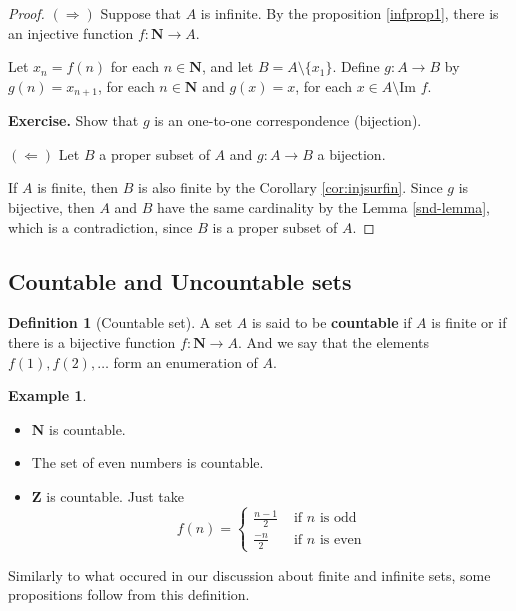 \documentclass[12pt,a4paper]{article}
\theoremstyle{definition}
\newtheorem{example}{Example}[section]
\newtheorem{definition}{Definition}[section]
\begin{document}
\begin{proof}
	$(\Rightarrow)$ Suppose that $A$ is infinite. By the proposition \ref{infprop1}, there is an injective function $f : \textbf{N} \longrightarrow A$.
	
	Let $x_n = f(n)$ for each $n \in \textbf{N}$, and let $B = A \setminus \{ x_1 \}$. Define $g : A \longrightarrow B$ by $g(n) = x_{n+1}$, for each $n \in \textbf{N}$ and $g(x) = x$, for each $x \in A \setminus \text{Im } f$.
	
	\textbf{Exercise.} Show that $g$ is an one-to-one correspondence (bijection).
	
	$(\Leftarrow)$ Let $B$ a proper subset of $A$ and $g : A \longrightarrow B$ a bijection.
	
	If $A$ is finite, then $B$ is also finite by the Corollary \ref{cor:injsurfin}. Since $g$ is bijective, then $A$ and $B$ have the same cardinality by the Lemma \ref{snd-lemma}, which is a contradiction, since $B$ is a proper subset of $A$.
\end{proof}

\subsection{Countable and Uncountable sets}

\begin{definition}[Countable set]
	A set $A$ is said to be \textbf{countable} if $A$ is finite or if there is a bijective function $f : \textbf{N} \longrightarrow A$. And we say that the elements $f(1), f(2), \ldots$ form an enumeration of $A$.
\end{definition}

\begin{example} \hfill
	\begin{itemize}
		\item $\textbf{N}$ is countable.
		\item The set of even numbers is countable.
		\item $\textbf{Z}$ is countable. Just take \[ f(n) = \begin{cases} 
      \frac{n-1}{2} & \text{ if } n \text{ is odd} \\
      \frac{-n}{2} & \text{ if } n \text{ is even}
   \end{cases} \]
	\end{itemize}
\end{example}

Similarly to what occured in our discussion about finite and infinite sets, some propositions follow from this definition.
\end{document}
